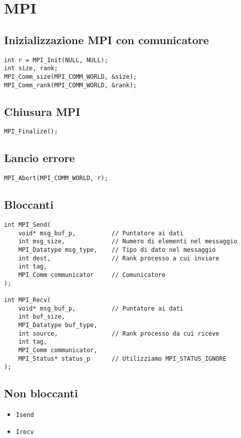 \documentclass[a4paper,12pt]{article}
\begin{document}
\section{MPI}

\subsection{Inizializzazione MPI con comunicatore}
\begin{verbatim}
int r = MPI_Init(NULL, NULL);
int size, rank;
MPI_Comm_size(MPI_COMM_WORLD, &size);
MPI_Comm_rank(MPI_COMM_WORLD, &rank);
\end{verbatim}

\subsection{Chiusura MPI}
\begin{verbatim}
MPI_Finalize();
\end{verbatim}

\subsection{Lancio errore}
\begin{verbatim}
MPI_Abort(MPI_COMM_WORLD, r);
\end{verbatim}

\subsection{Bloccanti}
\begin{verbatim}
int MPI_Send(
    void* msg_buf_p,          // Puntatore ai dati
    int msg_size,             // Numero di elementi nel messaggio
    MPI_Datatype msg_type,    // Tipo di dato nel messaggio
    int dest,                 // Rank processo a cui inviare
    int tag,
    MPI_Comm communicator     // Comunicatore
);

int MPI_Recv(
    void* msg_buf_p,          // Puntatore ai dati
    int buf_size,
    MPI_Datatype buf_type,
    int source,               // Rank processo da cui riceve
    int tag,
    MPI_Comm communicator,
    MPI_Status* status_p      // Utilizziamo MPI_STATUS_IGNORE
);
\end{verbatim}

\subsection{Non bloccanti}
\begin{itemize}
    \item \texttt{Isend}
    \item \texttt{Irecv}
\end{itemize}
\end{document}
